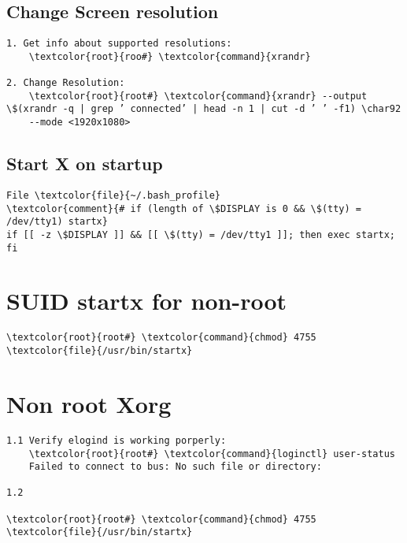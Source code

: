 \documentclass[10pt, a4paper, onecolumn, openany]{book}         %
\begin{document}
\subsection{Change Screen resolution}
\begin{Verbatim}[commandchars=\\\{\}]
1. Get info about supported resolutions:
    \textcolor{root}{roo#} \textcolor{command}{xrandr}
    
2. Change Resolution:
    \textcolor{root}{root#} \textcolor{command}{xrandr} --output \$(xrandr -q | grep ’ connected’ | head -n 1 | cut -d ’ ’ -f1) \char92
    --mode <1920x1080>
\end{Verbatim}

\subsection{Start X on startup}
\begin{Verbatim}[commandchars=\\\{\}]
File \textcolor{file}{~/.bash_profile}
\textcolor{comment}{# if (length of \$DISPLAY is 0 && \$(tty) = /dev/tty1) startx}
if [[ -z \$DISPLAY ]] && [[ \$(tty) = /dev/tty1 ]]; then exec startx; fi
\end{Verbatim}

\section{SUID startx for non-root}
\begin{Verbatim}[commandchars=\\\{\}]
\textcolor{root}{root#} \textcolor{command}{chmod} 4755 \textcolor{file}{/usr/bin/startx}
\end{Verbatim}

\section{Non root Xorg}
\begin{Verbatim}[commandchars=\\\{\}]
1.1 Verify elogind is working porperly:
    \textcolor{root}{root#} \textcolor{command}{loginctl} user-status
    Failed to connect to bus: No such file or directory:
    
1.2

\textcolor{root}{root#} \textcolor{command}{chmod} 4755 \textcolor{file}{/usr/bin/startx}
\end{Verbatim}


\newpage
\end{document}
